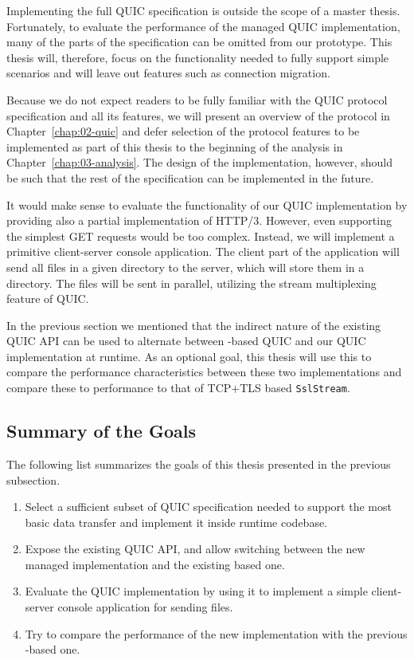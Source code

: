 Implementing the full QUIC specification is outside the scope of a master thesis. Fortunately, to
evaluate the performance of the managed QUIC implementation, many of the parts of the specification
can be omitted from our prototype. This thesis will, therefore, focus on the functionality needed to
fully support simple scenarios and will leave out features such as connection migration.

Because we do not expect readers to be fully familiar with the QUIC protocol specification and all
its features, we will present an overview of the protocol in Chapter~\ref{chap:02-quic} and defer
selection of the protocol features to be implemented as part of this thesis to the beginning of the
analysis in Chapter~\ref{chap:03-analysis}. The design of the implementation, however, should be
such that the rest of the specification can be implemented in the future.

It would make sense to evaluate the functionality of our QUIC implementation by providing also a
partial implementation of HTTP/3. However, even supporting the simplest GET requests would be too
complex. Instead, we will implement a primitive client-server console application. The client part
of the application will send all files in a given directory to the server, which will store them in
a directory. The files will be sent in parallel, utilizing the stream multiplexing feature of
QUIC\@.

In the previous section we mentioned that the indirect nature of the existing QUIC API can be used
to alternate between \libmsquic{}-based QUIC and our QUIC implementation at runtime. As an optional
goal, this thesis will use this to compare the performance characteristics between these two
implementations and compare these to performance to that of TCP+TLS based \texttt{SslStream}.

\subsection*{Summary of the Goals}

The following list summarizes the goals of this thesis presented in the previous subsection.

\begin{enumerate}

  \item Select a sufficient subset of QUIC specification needed to support the most basic data
    transfer and implement it inside \dotnet{} runtime codebase.

  \item Expose the existing QUIC API, and allow switching between the new managed implementation and
    the existing \libmsquic{} based one.

  \item Evaluate the QUIC implementation by using it to implement a simple client-server console
    application for sending files.

  \item {} Try to compare the performance of the new
    implementation with the previous \libmsquic{}-based one.

\end{enumerate}
